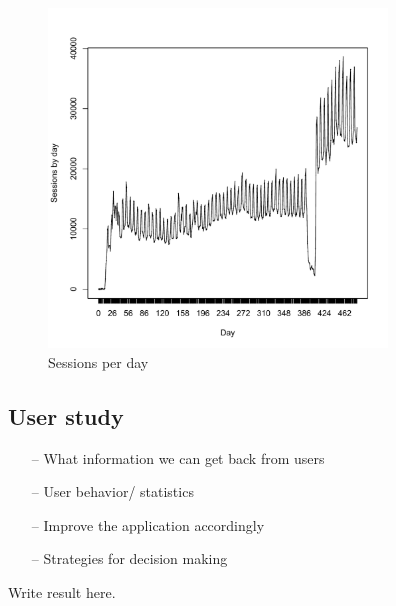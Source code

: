 \begin{figure}[htb]
\centering \includegraphics[height=9cm]{charts/sessions_per_day}
\caption{Sessions per day \label{sessions_perday}}
\end{figure}


\subsection{User study}
\begin{itemize}
\item[--]What information we can get back from users
\item[--]User behavior/ statistics
\item[--]Improve the application accordingly
\item[--]Strategies for decision making
\end{itemize}
Write result here.